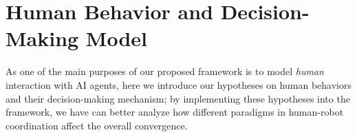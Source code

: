 \documentclass[letterpaper, 10 pt, conference]{ieeeconf}  %
\newcommand{\argmax}{\arg\!\!\max}
\begin{document}



\section{Human Behavior and Decision-Making Model}\label{sec:human_behavior}
As one of the main purposes of our proposed framework is to model \textit{human} 
interaction with AI agents, here we introduce our hypotheses on human 
behaviors and their decision-making mechanism; by implementing these hypotheses 
into the framework, we have can better analyze how different paradigms in 
human-robot coordination affect the overall convergence.
\end{document}
